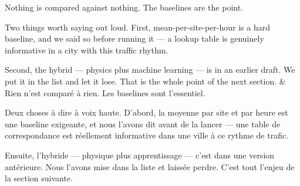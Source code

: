 \documentclass[10pt,a4paper]{article}
\begin{document}
\begin{say}
Nothing is compared against nothing. The baselines are the point.

Two things worth saying out loud. First, mean-per-site-per-hour is a hard
baseline, and we said so before running it --- a lookup table is genuinely
informative in a city with this traffic rhythm.

Second, the hybrid --- physics plus machine learning --- is  in an earlier draft. We put it in the list and let
it lose. That is the whole point of the next section.
&
Rien n'est comparé à rien. Les baselines sont l'essentiel.

Deux choses à dire à voix haute. D'abord, la moyenne par site et par heure est une
baseline exigeante, et nous l'avons dit avant de la lancer --- une table de
correspondance est réellement informative dans une ville à ce rythme de trafic.

Ensuite, l'hybride --- physique plus apprentissage --- c'est  dans une version antérieure. Nous l'avons
mise dans la liste et laissée perdre. C'est tout l'enjeu de la section suivante.
\end{say}

\clearpage
\end{document}
